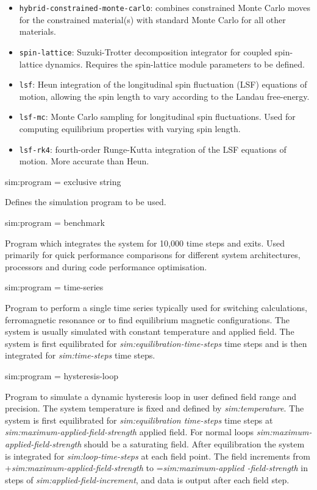 \begin{itemize}
  \item[] \texttt{hybrid-constrained-monte-carlo}: combines constrained Monte Carlo moves for the constrained material(s) with standard Monte Carlo for all other materials.
  \item[] \texttt{spin-lattice}: Suzuki-Trotter decomposition integrator for coupled spin-lattice dynamics. Requires the spin-lattice module parameters to be defined.
  \item[] \texttt{lsf}: Heun integration of the longitudinal spin fluctuation (LSF) equations of motion, allowing the spin length to vary according to the Landau free-energy.
  \item[] \texttt{lsf-mc}: Monte Carlo sampling for longitudinal spin fluctuations. Used for computing equilibrium properties with varying spin length.
  \item[] \texttt{lsf-rk4}: fourth-order Runge-Kutta integration of the LSF equations of motion. More accurate than Heun.
\end{itemize}

{\zicf sim:program = exclusive string} Defines the simulation program to be used.

{\zicf sim:program = benchmark} Program which integrates the system for 10,000 time steps and exits. Used primarily for quick performance comparisons for different system architectures, processors and during code performance optimisation.

{\zicf sim:program = time-series} Program to perform a single time series typically used for switching calculations, ferromagnetic resonance or to find equilibrium magnetic configurations. The system is usually simulated with constant temperature and applied field. The system is first equilibrated for \textit{sim:equilibration-time-steps} time steps and is then integrated for \textit{sim:time-steps} time steps.

{\zicf sim:program = hysteresis-loop} Program to simulate a dynamic hysteresis loop in user defined field range and precision. The system temperature is fixed and defined by \textit{sim:temperature}. The system is first equilibrated for \textit{sim:equilibration time-steps} time steps at \textit{sim:maximum-applied-field-strength} applied field. For normal loops \textit{sim:maximum-applied-field-strength} should be a saturating field. After equilibration the system is integrated for \textit{sim:loop-time-steps} at each field point. The field increments from +\textit{sim:maximum-applied-field-strength} to =\textit{sim:maximum-applied -field-strength} in steps of \textit{sim:applied-field-increment}, and data is output after each field step.


